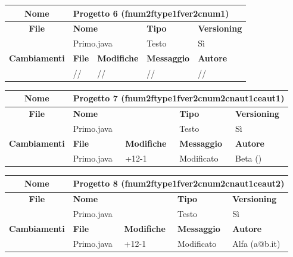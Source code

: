 \begin{table}[ht]
\footnotesize
\begin{tabular}{|c|p{2.5cm}|p{2cm}|p{2.5cm}|p{2.5cm}|}
  \hline
  \textbf{Nome}	& \multicolumn{4}{l|}{Progetto 6 (fnum2ftype1fver2cnum1)} 										\\
  \hline
  \rowcolor{lightgray}\textbf{File} 		& \multicolumn{2}{l|}{\textbf{Nome}}		& \textbf{Tipo}		& \textbf{Versioning} 		\\
						\cline{2-5}
						& \multicolumn{2}{l|}{Primo.java}		& Testo			& Sì				\\
  \hline
  \rowcolor{lightgray}\textbf{Cambiamenti}	& \textbf{File}		&\textbf{Modifiche}	& \textbf{Messaggio}	& \textbf{Autore}		\\
						\cline{2-5}
						& //			& //	  		& //			& //				\\
						
  \hline
\end{tabular}
\end{table}

\begin{table}[ht]
\footnotesize
\begin{tabular}{|c|p{2.5cm}|p{2cm}|p{2.5cm}|p{2.5cm}|}
  \hline
  \textbf{Nome}	& \multicolumn{4}{l|}{Progetto 7 (fnum2ftype1fver2cnum2cnaut1ceaut1)} 									\\
  \hline
  \rowcolor{lightgray}\textbf{File} 		& \multicolumn{2}{l|}{\textbf{Nome}}		& \textbf{Tipo}		& \textbf{Versioning} 		\\
						\cline{2-5}
						& \multicolumn{2}{l|}{Primo.java}		& Testo			& Sì				\\
  \hline
  \rowcolor{lightgray}\textbf{Cambiamenti}	& \textbf{File}		&\textbf{Modifiche}	& \textbf{Messaggio}	& \textbf{Autore}		\\
						\cline{2-5}
						& Primo.java		& +12-1	 		& Modificato		& Beta ()			\\
						
  \hline
\end{tabular}
\end{table}

\begin{table}[ht]
\footnotesize
\begin{tabular}{|c|p{2.5cm}|p{2cm}|p{2.5cm}|p{2.5cm}|}
  \hline
  \textbf{Nome}	& \multicolumn{4}{l|}{Progetto 8 (fnum2ftype1fver2cnum2cnaut1ceaut2)} 									\\
  \hline
  \rowcolor{lightgray}\textbf{File} 		& \multicolumn{2}{l|}{\textbf{Nome}}		& \textbf{Tipo}		& \textbf{Versioning} 		\\
						\cline{2-5}
						& \multicolumn{2}{l|}{Primo.java}		& Testo			& Sì				\\
  \hline
  \rowcolor{lightgray}\textbf{Cambiamenti}	& \textbf{File}		&\textbf{Modifiche}	& \textbf{Messaggio}	& \textbf{Autore}		\\
						\cline{2-5}
						& Primo.java		& +12-1	  		& Modificato		& Alfa (a@b.it)			\\
						
  \hline
\end{tabular}
\end{table}

